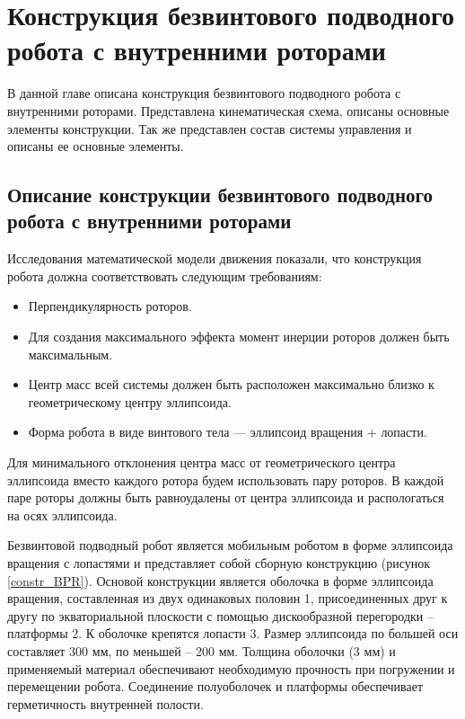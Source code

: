 \chapter{Конструкция безвинтового подводного робота с внутренними роторами}\label{ch:ch3}

В данной главе описана конструкция безвинтового подводного робота с внутренними роторами. Представлена кинематическая схема, описаны основные элементы конструкции. Так же представлен состав системы управления и описаны ее основные элементы.



\section{Описание конструкции безвинтового подводного робота с внутренними роторами}

Исследования математической модели движения показали, что конструкция робота должна соответствовать следующим требованиям:

\begin{itemize}
	\item Перпендикулярность роторов.
	\item Для создания максимального эффекта момент инерции роторов должен быть максимальным.
	\item Центр масс всей системы должен быть расположен максимально близко к геометрическому центру эллипсоида.
	\item Форма робота в виде винтового тела --- эллипсоид вращения + лопасти.
\end{itemize}

Для минимального отклонения центра масс от геометрического центра эллипсоида вместо каждого ротора будем использовать пару роторов. В каждой паре роторы должны быть равноудалены от центра эллипсоида и распологаться на осях эллипсоида.

Безвинтовой подводный робот является мобильным роботом в форме эллипсоида вращения с лопастями и представляет собой сборную конструкцию (рисунок \ref{constr_BPR}). Основой конструкции является оболочка в форме эллипсоида вращения, составленная из двух одинаковых половин 1, присоединенных друг к другу по экваториальной плоскости с помощью дискообразной перегородки – платформы 2. К оболочке крепятся лопасти 3. Размер эллипсоида по большей оси составляет 300 мм, по меньшей – 200 мм. Толщина оболочки (3 мм) и применяемый материал обеспечивают необходимую прочность при погружении и перемещении робота. Соединение полуоболочек и платформы обеспечивает герметичность внутренней полости.

